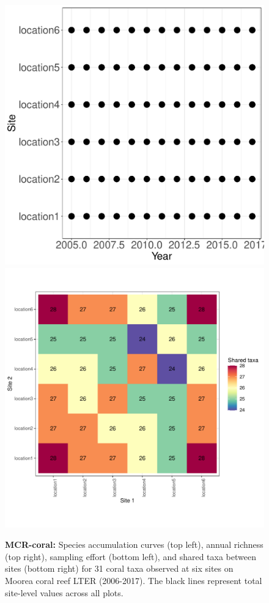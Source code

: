 \documentclass[11pt, oneside]{article}
\begin{document}
\begin{figure}[h!]
\includegraphics[scale = 0.4]{mcr-coral-castorani_spatiotemporal_sampling_effort.pdf}
\includegraphics[scale = 0.4]{mcr-coral-castorani_spp_shared.pdf}
\caption{{\bf MCR-coral:} Species accumulation curves (top left),  annual richness (top right), sampling effort (bottom left), and shared taxa between sites (bottom right) for 31 coral taxa observed at six sites on Moorea coral reef LTER (2006-2017). The black lines represent total site-level values across all plots.}
\label{mcr-coral}
\end{figure}
\end{document}
